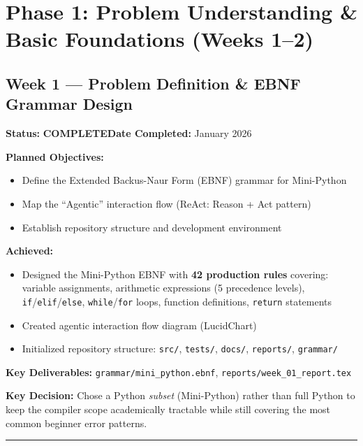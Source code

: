 \documentclass[a4paper,11pt]{article}
\newcommand{\done}{\colorbox{green!25}{\textbf{\small COMPLETE}}}
\begin{document}
\newpage
\section{Phase 1: Problem Understanding \& Basic Foundations (Weeks 1--2)}

\subsection{Week 1 --- Problem Definition \& EBNF Grammar Design}

\textbf{Status:} \done \hfill \textbf{Date Completed:} January 2026

\textbf{Planned Objectives:}
\begin{itemize}[leftmargin=*, itemsep=1pt]
    \item Define the Extended Backus-Naur Form (EBNF) grammar for Mini-Python
    \item Map the ``Agentic'' interaction flow (ReAct: Reason + Act pattern)
    \item Establish repository structure and development environment
\end{itemize}

\textbf{Achieved:}
\begin{itemize}[leftmargin=*, itemsep=1pt]
    \item Designed the Mini-Python EBNF with \textbf{42 production rules} covering: variable assignments, arithmetic expressions (5 precedence levels), \texttt{if}/\texttt{elif}/\texttt{else}, \texttt{while}/\texttt{for} loops, function definitions, \texttt{return} statements
    \item Created agentic interaction flow diagram (LucidChart)
    \item Initialized repository structure: \texttt{src/}, \texttt{tests/}, \texttt{docs/}, \texttt{reports/}, \texttt{grammar/}
\end{itemize}

\textbf{Key Deliverables:} \texttt{grammar/mini\_python.ebnf}, \texttt{reports/week\_01\_report.tex}

\textbf{Key Decision:} Chose a Python \textit{subset} (Mini-Python) rather than full Python to keep the compiler scope academically tractable while still covering the most common beginner error patterns.

\vspace{4pt}\hrule\vspace{6pt}
\end{document}
